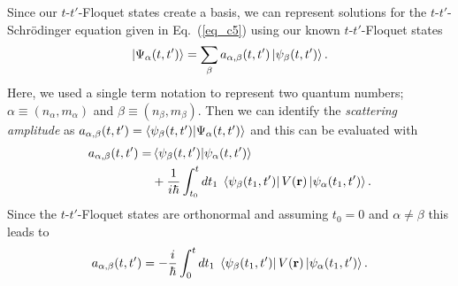 Since our $t$-$t'$-Floquet states create a basis, we can represent solutions for the $t$-$t'$-Schrödinger equation given in Eq.~(\ref{eq_c5}) using our known $t$-$t'$-Floquet states
\begin{equation} \label{eq_c12}
  \ket{\Psi_{\alpha}(t,t')} = \sum_{\beta} a_{\alpha,\beta}(t,t')
  \ket{\psi_{\beta}(t,t')}.
\end{equation}
Here, we used a single term notation to represent two quantum numbers; $\alpha \equiv (n_{\alpha},m_{\alpha})$ and $\beta \equiv (n_{\beta},m_{\beta})$.
Then we can identify the \textit{scattering amplitude} as $a_{\alpha,\beta}(t,t') =
\braket{\psi_{\beta}(t,t')}{\Psi_{\alpha}(t,t')}$ and this can be evaluated with
\begin{equation} \label{eq_c13}
  \begin{aligned}
  a_{\alpha,\beta}(t,t') = &
  \braket{\psi_{\beta}(t,t')}{\psi_{\alpha}(t,t')} \\
  &+
  \frac{1}{i\hbar}
  \int_{t_0}^t dt_1 \;
  \bra{\psi_{\beta}(t_1,t')}
  V(\vb{r}) \ket{\psi_{\alpha}(t_1,t')}.
  \end{aligned}
\end{equation}
Since the $t$-$t'$-Floquet states are orthonormal and assuming $t_0 = 0$ and $\alpha \neq \beta$ this leads to
\begin{equation} \label{eq_c14}
  a_{\alpha,\beta}(t,t') =
  -
  \frac{i}{\hbar}
  \int_{0}^t dt_1 \;
  \bra{\psi_{\beta}(t_1,t')}
  V(\vb{r}) \ket{\psi_{\alpha}(t_1,t')}.
\end{equation}


